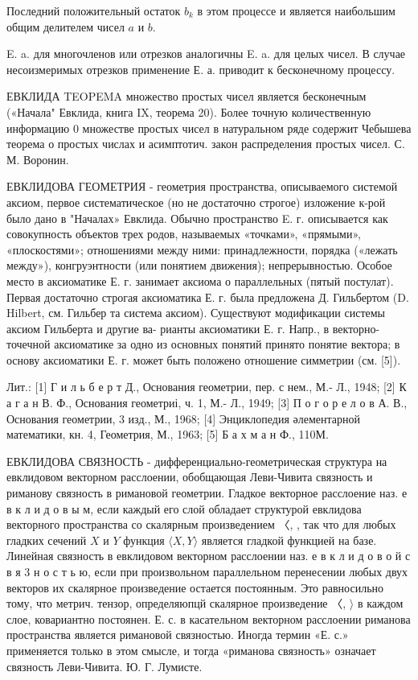 \documentclass[10pt]{article}
\begin{document}
Последний положительный остаток $b_{k}$ в этом процессе и является наибольшим общим делителем чисел $a$ и $b$.



E. a. для многочленов или отрезков аналогичны E. a. для целых чисел. В случае несоизмеримых отрезков применение Е. а. приводит к бесконечному процессу.



ЕВКЛИДА TEOPEMA множество простых чисел является бесконечным («Начала" Евклида, книга IX, теорема 20). Более точную количественную информацию 0 множестве простых чисел в натуральном ряде содержит Чебышева теорема о простых числах и асимптотич. закон распределения простых чисел. С. М. Воронин.



ЕВКЛИДОВА ГЕОМЕТРИЯ - геометрия пространства, описываемого системой аксиом, первое систематическое (но не достаточно строгое) изложение к-рой было дано в "Началах» Евклида. Обычно пространство E. г. описывается как совокупность объектов трех родов, называемых «точками», «прямыми», «плоскостями»; отношениями между ними: принадлежности, порядка («лежать между»), конгруэнтности (или понятием движения); непрерывностью. Особое место в аксиоматике Е. г. занимает аксиома о параллельных (пятый постулат). Первая достаточно строгая аксиоматика Е. г. была предложена Д. Гильбертом (D. Hilbert, см. Гильбер та система аксиом). Существуют модификации системы аксиом Гильберта и другие ва- рианты аксиоматики Е. г. Напр., в векторно-точечной аксиоматике за одно из основных понятий принято понятие вектора; в основу аксиоматики Е. г. может быть положено отношение симметрии (см. [5]).



Лит.: [1] Г и л ь б е р т Д., Основания геометрии, пер. с нем., М.- Л., 1948; [2] К а г а н В. Ф., Основания геометриі, ч. 1, М.- Л., 1949; [3] П о г о р е л о в А. В., Основания геометрии, 3 изд., М., 1968; [4] Энциклопедия әлементарной математики, кн. 4, Геометрия, М., 1963; [5] Б а х м а н Ф., 110М.



ЕВКЛИДОВА СВЯЗНОСТЬ - дифференциально-геометрическая структура на евклидовом векторном расслоении, обобщающая Леви-Чивита связность и риманову связность в римановой геометрии. Гладкое векторное расслоение наз. е в к л и д о в ы м, если каждый его слой обладает структурой евклидова векторного пространства со скалярным произведением 〈, , так что для любых гладких сечений $X$ и $Y$ функция $\langle X, Y\rangle$ является гладкой функцией на базе. Линейная связность в евклидовом векторном расслоении наз. е в к л и д о в о й с в я 3 н о с т ь ю, если при произвольном параллельном перенесении любых двух векторов их скалярное произведение остается постоянным. Это равносильно тому, что метрич. тензор, определяюпцй скалярное произведение 〈, $\rangle$ в каждом слое, ковариантно постоянен. Е. с. в касательном векторном расслоении риманова пространства является римановой связностью. Иногда термин «Е. с.» применяется только в этом смысле, и тогда «риманова связность» означает связность Леви-Чивита. Ю. Г. Лумисте.
\end{document}
